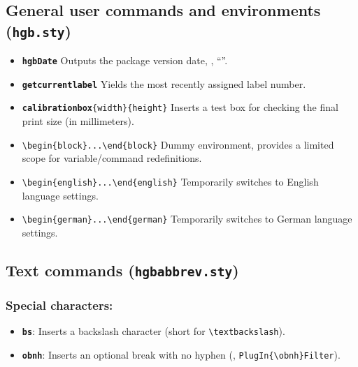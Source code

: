 \documentclass[english]{hgbarticle}
\begin{document}
\subsection{General user commands and environments (\texttt{hgb.sty})}

\begin{itemize}
    \item \textbf{\texttt{{\bs}hgbDate}}\newline
    Outputs the package version date,
    \eg, ``\texttt{\hgbDate}''.
		\item \textbf{\texttt{{\bs}getcurrentlabel}}\newline
    Yields the most recently assigned label number.
    \item \textbf{\texttt{{\bs}calibrationbox}}\verb!{width}{height}!\newline
    Inserts a test box for checking the final print size (in millimeters).
		\item \verb!\begin{block}...\end{block}!\newline
    Dummy environment, provides a limited scope for variable/command redefinitions.
    \item \verb!\begin{english}...\end{english}!\newline
    Temporarily switches to English language settings.
    \item \verb!\begin{german}...\end{german}!\newline
    Temporarily switches to German language settings.
\end{itemize}


\subsection{Text commands (\texttt{hgbabbrev.sty})}

\subsubsection*{Special characters:}

\begin{itemize}
    \item \textbf{\texttt{{\bs}bs}}: Inserts a backslash character (short for
    \verb!\textbackslash!).
    \item \textbf{\texttt{{\bs}obnh}}: Inserts an optional break with no
    hyphen (\eg, \verb!PlugIn{\obnh}Filter!).
\end{itemize}
\end{document}
